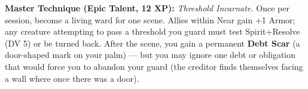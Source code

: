 \begin{tcolorbox}[colback=black!5,colframe=blue!70!black,title=\textbf{Threshold Monk (Sealed Gate)},breakable]
  \vspace{2mm}
  \noindent\textbf{Master Technique (Epic Talent, 12 XP):}
  \textit{Threshold Incarnate.} Once per session, become a living ward for one scene. Allies within Near gain +1 Armor; any creature attempting to pass a threshold you guard must test Spirit+Resolve (DV 5) or be turned back. After the scene, you gain a permanent \textbf{Debt Scar} (a door-shaped mark on your palm) --- but you may ignore one debt or obligation that would force you to abandon your guard (the creditor finds themselves facing a wall where once there was a door).
\end{tcolorbox}